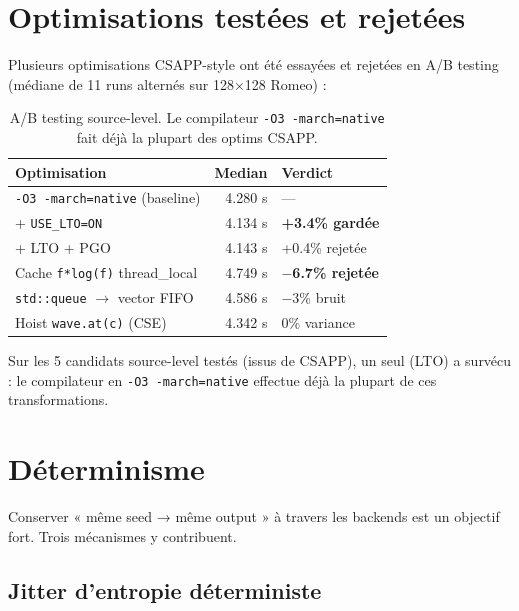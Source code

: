 \section{Optimisations testées et rejetées}
\label{sec:omp:rejected}

Plusieurs optimisations CSAPP-style ont été essayées et rejetées en A/B testing (médiane de 11 runs alternés sur 128×128 Romeo) :

\begin{table}[H]
\centering
\small
\begin{tabularx}{\textwidth}{Xrl}
\toprule
\textbf{Optimisation} & \textbf{Median} & \textbf{Verdict} \\
\midrule
\texttt{-O3 -march=native} (baseline) & 4.280 s & --- \\
+ \texttt{USE\_LTO=ON} & 4.134 s & \textbf{+3.4\% gardée} \\
+ LTO + PGO & 4.143 s & +0.4\% rejetée \\
Cache \texttt{f*log(f)} thread\_local & 4.749 s & \textbf{$-$6.7\% rejetée} \\
\texttt{std::queue} $\to$ vector FIFO & 4.586 s & $-$3\% bruit \\
Hoist \texttt{wave.at(c)} (CSE) & 4.342 s & 0\% variance \\
\bottomrule
\end{tabularx}
\caption{A/B testing source-level. Le compilateur \texttt{-O3 -march=native} fait déjà la plupart des optims CSAPP.}
\label{tab:omp:rejected}
\end{table}

Sur les 5 candidats source-level testés (issus de CSAPP), un seul (LTO) a survécu : le compilateur en \texttt{-O3 -march=native} effectue déjà la plupart de ces transformations.

\section{Déterminisme}
\label{sec:omp:determinisme}

Conserver « même seed → même output » à travers les backends est un objectif fort. Trois mécanismes y contribuent.

\subsection{Jitter d'entropie déterministe}

